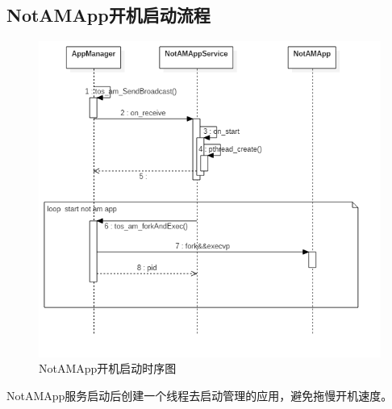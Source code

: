 \subsection{NotAMApp开机启动流程}
\begin{figure}[H]
  \centering
  \includegraphics[width=\textwidth]{image/tbrw2_app_optimization/png/start_not_am_app.png}
  \caption{NotAMApp开机启动时序图}
\end{figure}
NotAMApp服务启动后创建一个线程去启动管理的应用，避免拖慢开机速度。

